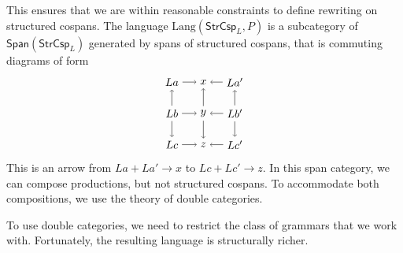 \documentclass{amsart}
\newcommand{\Span}{\cat{Span}}
\newcommand{\StrCsp}{\cat{StrCsp}}
\newcommand{\Lang}{\mathrm{Lang}}
\newcommand{\cat}[1]{\mathsf{#1}}
\newcommand{\csp}[3]{#1 + #3 \to #2}
\theoremstyle{remark}
\theoremstyle{definition}
\begin{document}
This ensures that we are within reasonable
constraints to define rewriting on structured cospans. The language
$ \Lang ( \StrCsp_{L} , P ) $ is a subcategory of
$ \Span ( \StrCsp_{L} ) $ generated by spans of structured cospans,
that is commuting diagrams of form
%
\[
  \begin{tikzpicture}
    \node (1) at (0,2) {\( La \)};
    \node (2) at (1,2) {\( x \)};
    \node (3) at (2,2) {\( La' \)};
    \node (4) at (0,1) {\( Lb \)};
    \node (5) at (1,1) {\( y \)};
    \node (6) at (2,1) {\( Lb' \)};
    \node (7) at (0,0) {\( Lc \)};
    \node (8) at (1,0) {\( z \)};
    \node (9) at (2,0) {\( Lc' \)};
    \draw [->] (1) to node [] {\scriptsize{\(  \)}} (2);
    \draw [->] (3) to node [] {\scriptsize{\(  \)}} (2);
    \draw [->] (4) to node [] {\scriptsize{\(  \)}} (5);
    \draw [->] (6) to node [] {\scriptsize{\(  \)}} (5);
    \draw [->] (7) to node [] {\scriptsize{\(  \)}} (8);
    \draw [->] (9) to node [] {\scriptsize{\(  \)}} (8);
    \draw [->] (4) to node [] {\scriptsize{\(  \)}} (1);
    \draw [->] (4) to node [] {\scriptsize{\(  \)}} (7);
    \draw [->] (5) to node [] {\scriptsize{\(  \)}} (2);
    \draw [->] (5) to node [] {\scriptsize{\(  \)}} (8);
    \draw [->] (6) to node [] {\scriptsize{\(  \)}} (3);
    \draw [->] (6) to node [] {\scriptsize{\(  \)}} (9); 
  \end{tikzpicture}
\]
% 
This is an arrow from $ \csp{La}{x}{La'}$ to $ \csp{Lc}{z}{Lc'} $. In
this span category, we can compose productions, but not structured
cospans.  To accommodate both compositions, we use the theory of
double categories.

To use double categories, we need to restrict the class of grammars
that we work with.  Fortunately, the resulting language is
structurally richer. 
\end{document}
